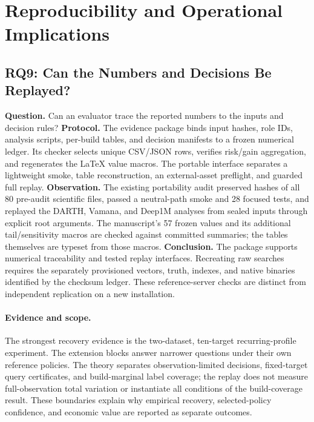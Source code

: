 \section{Reproducibility and Operational Implications}
\label{sec:discussion}

\subsection{RQ9: Can the Numbers and Decisions Be Replayed?}
\textbf{Question.} Can an evaluator trace the reported numbers to the inputs and decision rules?
\textbf{Protocol.} The evidence package binds input hashes, role IDs, analysis scripts, per-build tables, and decision manifests to a frozen numerical ledger. Its checker selects unique CSV/JSON rows, verifies risk/gain aggregation, and regenerates the LaTeX value macros. The portable interface separates a lightweight smoke, table reconstruction, an external-asset preflight, and guarded full replay.
\textbf{Observation.} The existing portability audit preserved hashes of all 80 pre-audit scientific files, passed a neutral-path smoke and 28 focused tests, and replayed the DARTH, Vamana, and Deep1M analyses from sealed inputs through explicit root arguments. The manuscript's 57 frozen values and its additional tail/sensitivity macros are checked against committed summaries; the tables themselves are typeset from those macros.
\textbf{Conclusion.} The package supports numerical traceability and tested replay interfaces. Recreating raw searches requires the separately provisioned vectors, truth, indexes, and native binaries identified by the checksum ledger. These reference-server checks are distinct from independent replication on a new installation.

\paragraph{Evidence and scope.}
The strongest recovery evidence is the two-dataset, ten-target recurring-profile experiment. The extension blocks answer narrower questions under their own reference policies. The theory separates observation-limited decisions, fixed-target query certificates, and build-marginal label coverage; the replay does not measure full-observation total variation or instantiate all conditions of the build-coverage result. These boundaries explain why empirical recovery, selected-policy confidence, and economic value are reported as separate outcomes.

